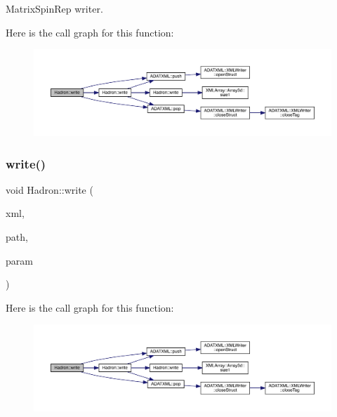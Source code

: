 Matrix\+Spin\+Rep writer. 

Here is the call graph for this function\+:
\nopagebreak
\begin{figure}[H]
\begin{center}
\leavevmode
\includegraphics[width=350pt]{d1/daf/namespaceHadron_a433908e65befd36f268196398b8469c7_cgraph}
\end{center}
\end{figure}
\mbox{\label{namespaceHadron_af4fede7daa1a73ae6be48e039292c692}} 
\subsubsection{\texorpdfstring{write()}{write()}\hspace{0.1cm}{\footnotesize\ttfamily [19/95]}}
{\footnotesize\ttfamily void Hadron\+::write (\begin{DoxyParamCaption}\item[{\mbox{\hyperlink{classADATXML_1_1XMLWriter}{X\+M\+L\+Writer}} \&}]{xml,  }\item[{const std\+::string \&}]{path,  }\item[{const \mbox{\hyperlink{structHadron_1_1KeyHadronNPartNPtCorr__t_1_1NPoint__t}{Key\+Hadron\+N\+Part\+N\+Pt\+Corr\+\_\+t\+::\+N\+Point\+\_\+t}} \&}]{param }\end{DoxyParamCaption})}

Here is the call graph for this function\+:
\nopagebreak
\begin{figure}[H]
\begin{center}
\leavevmode
\includegraphics[width=350pt]{d1/daf/namespaceHadron_af4fede7daa1a73ae6be48e039292c692_cgraph}
\end{center}
\end{figure}
\mbox{\label{namespaceHadron_a4b91e53beed52be0c8431a4464285dfd}} 
